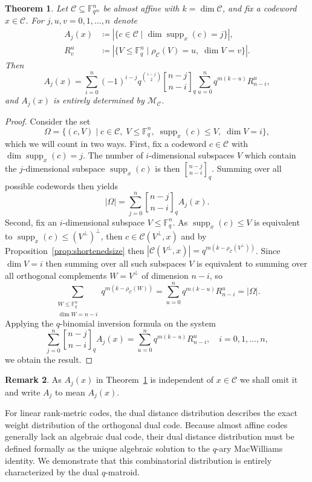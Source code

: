 \documentclass[a4paper,11pt,reqno]{article}
\newcommand{\F}{\mathbb{F}}
\newcommand{\M}{\mathcal{M}}
\newcommand{\supp}{\operatorname{supp}}
\newcommand{\C}{\mathcal{C}}
\newcommand{\qbinom}[2]{\genfrac[]{0pt}{0}{#1}{#2}}
\theoremstyle{plain} \numberwithin{equation}{section}
\newtheorem{theorem}{Theorem}[section]
\theoremstyle{definition}
\newtheorem{remark}[theorem]{Remark}
\begin{document}
\begin{theorem} \label{thm:x-distance}
    Let $\C\subseteq \F_{q^m}^n$ be almost affine with $k=\dim \C$, and fix a codeword $x\in \C$. For $j,u,v=0,1,\ldots,n$ denote
    \begin{align*}
    A_j(x) &\coloneqq |\{c \in \C \mid \dim \supp_x(c) = j\}|,\\
        R_v^u &\coloneqq |\{ V\leq \F_q^n \mid \rho_\C(V)=u,\; \dim V = v\}|.
    \end{align*}
    Then
    \[
    A_j(x) = \sum_{i = 0}^n(-1)^{i-j}q^{\binom{i-j}{2}}\qbinom{n-j}{n-i}_q \sum^{n}_{u=0} q^{m(k-u)}R_{n-i}^u,
    \]
    and $A_j(x)$ is entirely determined by $\M_\C$.
\end{theorem}
\begin{proof}
    Consider the set
    \[
    \Omega = \{ (c,V)\mid c\in \C,\; V\leq \F_q^n,\; \supp_x(c)\leq V,\; \dim V = i\},
    \]
    which we will count in two ways. First, fix a codeword $c\in \C$ with $\dim \supp_x(c)=j$. The number of $i$-dimensional subspaces $V$ which contain the $j$-dimensional subspace $\supp_x(c)$ is then $\qbinom{n-j}{n-i}_q$. Summing over all possible codewords then yields
    \[
        |\Omega| = \sum^{n}_{j=0} \qbinom{n-j}{n-i}_q A_j(x).
    \]
    Second, fix an $i$-dimensional subspace $V\leq \F_q^n$. As $\supp_x(c)\leq V$ is equivalent to $\supp_x(c) \leq (V^\perp)^\perp$, then $c\in \C(V^\perp,x)$ and by Proposition~\ref{prop:shortenedsize} then $|\C(V^\perp,x)| = q^{m(k-\rho_\C(V^\perp))}$. Since $\dim V = i$ then summing over all such subspaces $V$ is equivalent to summing over all orthogonal complements $W= V^\perp$ of dimension $n-i$, so
    \[ \sum_{\substack{W\leq \F_q^n \\ \dim W = n-i}}q^{m(k- \rho_\C(W))} = \sum_{u=0}^{n}q^{m(k-u)} R_{n-i}^u = |\Omega|.
    \]
    Applying the $q$-binomial inversion formula on the system
    \[
    \sum^{n}_{j=0} \qbinom{n-j}{n-i}_q A_j(x) = \sum_{u=0}^{n}q^{m(k-u)} R_{n-i}^u, \quad i =0,1,\ldots,n,
    \]
    we obtain the result.
\end{proof}

\begin{remark}
As $A_j(x)$ in Theorem~\ref{thm:x-distance} is independent of $x\in \C$ we shall omit it and write $A_j$ to mean $A_j(x)$.
\end{remark}

For linear rank-metric codes, the dual distance distribution describes the exact weight distribution of the orthogonal dual code. Because almost affine codes generally lack an algebraic dual code, their dual distance distribution must be defined formally as the unique algebraic solution to the $q$-ary MacWilliams identity. We demonstrate that this combinatorial distribution is entirely characterized by the dual $q$-matroid.
\end{document}
